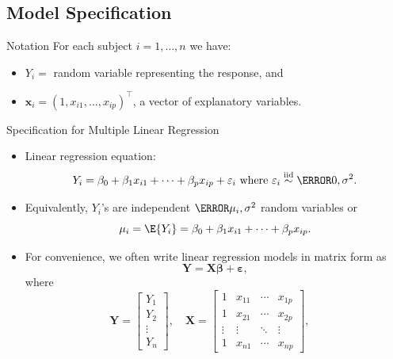 \documentclass[oneside]{book}\usepackage[]{graphicx}\usepackage[svgnames]{xcolor}
\newcommand*\circled[1]{\tikz[baseline=(char.base)]{\node[shape=circle,draw,inner sep=2pt] (char) {#1};}}
\newcommand{\iid}{\overset{\text{iid}}{\sim}}%
\providecommand{\RandomVector}[1]{\bm{#1}}%
\providecommand{\Vector}[1]{\bm{#1}}%
\providecommand{\Matrix}[1]{\bm{#1}}
\begin{document}
\subsection*{\circled{1} Model Specification}
\begin{Regular}{Notation}
      For each subject $ i=1,\ldots,n $ we have:
      \begin{itemize}
            \item $ Y_i = $ random variable representing the response, and
            \item $ \Vector{x}_i =(1,x_{i1},\ldots,x_{ip})^\top $, a vector of explanatory variables.
      \end{itemize}
\end{Regular}
\begin{Regular}{Specification for Multiple Linear Regression}
      \begin{itemize}
            \item Linear regression equation:
                  \[ Y_i=\beta_0+\beta_1x_{i1}+\cdots+\beta_p x_{ip}+\varepsilon_i\text{ where }\varepsilon_i \iid\N{0,\sigma^2}. \]
            \item Equivalently, $Y_i$'s are independent $ \N{\mu_i,\sigma^2} $ random variables or
                  \[ \mu_i=\E{Y_i}=\beta_0+\beta_1x_{i1}+\cdots+\beta_p x_{ip}. \]
            \item For convenience, we often write linear regression models in matrix form as
                  \[ \RandomVector{Y}=\Matrix{X}\Vector{\beta}+\RandomVector{\varepsilon}, \]
                  where
                  \[ \RandomVector{Y}=\begin{bmatrix}
                              Y_1    \\
                              Y_2    \\
                              \vdots \\
                              Y_n
                        \end{bmatrix},\quad
                        \Matrix{X}=\begin{bmatrix}
                              1      & x_{11} & \cdots & x_{1p} \\
                              1      & x_{21} & \cdots & x_{2p} \\
                              \vdots & \vdots & \ddots & \vdots \\
                              1      & x_{n1} & \cdots & x_{np}
                        \end{bmatrix},\quad
\]
\end{itemize}
\end{Regular}
\end{document}
